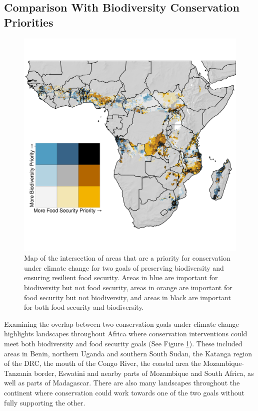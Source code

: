 \documentclass{article}
\begin{document}
\subsection{Comparison With Biodiversity Conservation Priorities}

\begin{figure}[h!]
	\begin{center}
		\includegraphics[width=0.8\linewidth]{Bivariate_Map.png}
		\caption{Map of the intersection of areas that are a priority for conservation under climate change for two goals of preserving biodiversity and ensuring resilient food security.  Areas in blue are important for biodiversity but not food security, areas in orange are important for food security but not biodiversity, and areas in black are important for both food security and biodiversity.}
		\label{fig:Bivariate_Map}
	\end{center}
\end{figure}

Examining the overlap between two conservation goals under climate change highlights landscapes throughout Africa where conservation interventions could meet both biodiversity and food security goals (See Figure \ref{fig:Bivariate_Map}).  These included areas in Benin, northern Uganda and southern South Sudan, the Katanga region of the DRC, the mouth of the Congo River, the coastal area the Mozambique-Tanzania border, Eswatini and nearby parts of Mozambique and South Africa, as well as parts of Madagascar. There are also many landscapes throughout the continent where conservation could work towards one of the two goals without fully supporting the other.
\end{document}
